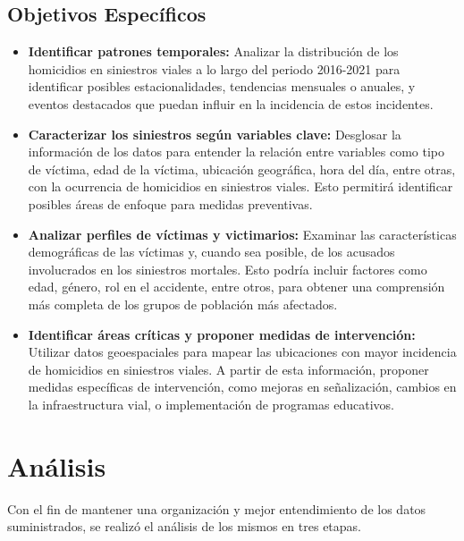 \documentclass[12pt]{article}
\begin{document}
\subsection{Objetivos Específicos}
\begin{itemize}

    \item \textbf{Identificar patrones temporales:} Analizar la distribución de los homicidios en siniestros viales a lo largo del periodo 2016-2021 para identificar posibles estacionalidades, tendencias mensuales o anuales, y eventos destacados que puedan influir en la incidencia de estos incidentes.
    
    \item \textbf{Caracterizar los siniestros según variables clave:} Desglosar la información de los datos para entender la relación entre variables como tipo de víctima, edad de la víctima, ubicación geográfica, hora del día, entre otras, con la ocurrencia de homicidios en siniestros viales. Esto permitirá identificar posibles áreas de enfoque para medidas preventivas. 
    
    \item \textbf{Analizar perfiles de víctimas y victimarios:} Examinar las características demográficas de las víctimas y, cuando sea posible, de los acusados involucrados en los siniestros mortales. Esto podría incluir factores como edad, género, rol en el accidente, entre otros, para obtener una comprensión más completa de los grupos de población más afectados.
    
    \item \textbf{Identificar áreas críticas y proponer medidas de intervención:} Utilizar datos geoespaciales para mapear las ubicaciones con mayor incidencia de homicidios en siniestros viales. A partir de esta información, proponer medidas específicas de intervención, como mejoras en señalización, cambios en la infraestructura vial, o implementación de programas educativos.
\end{itemize}

\section{Análisis}
Con el fin de mantener una organización y mejor entendimiento de los datos suministrados, se realizó el análisis de los mismos en tres etapas.  
\end{document}
